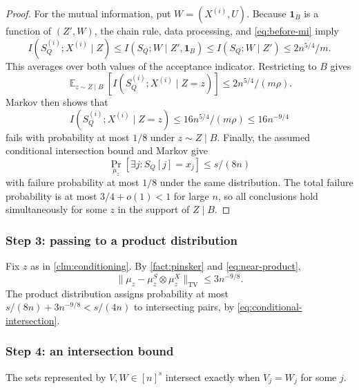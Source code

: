 \documentclass[11pt]{article}
\theoremstyle{plain}
\newcommand{\E}{\mathop{\mathbb{E}}}
\newcommand{\TV}{\mathrm{TV}}
\begin{document}
\begin{proof}
For the mutual information, put $W=(X^{(i)},U)$.
Because $\mathbf1_B$ is a function of $(Z',W)$,
the chain rule, data processing, and \eqref{eq:before-mi} imply
\[
 I(S_Q^{(i)};X^{(i)}\mid Z)
 \le I(S_Q;W\mid Z',\mathbf1_B)
 \le I(S_Q;W\mid Z')\le2n^{5/4}/m.
\]
This averages over both values of the acceptance indicator.
Restricting to $B$ gives
\[
 \E_{z\sim Z\mid B}\!\left[I(S_Q^{(i)};X^{(i)}\mid Z=z)\right]
 \le2n^{5/4}/(m\rho).
\]
Markov then shows that
\begin{equation}\label{eq:near-product}
 I(S_Q^{(i)};X^{(i)}\mid Z=z)\le16n^{5/4}/(m\rho)\le16n^{-9/4}
\end{equation}
fails with probability at most $1/8$ under $z\sim Z\mid B$.
Finally, the assumed conditional intersection bound and Markov give
\begin{equation}\label{eq:conditional-intersection}
 \Pr_{\mu_z}[\exists j:S_Q[j]=x_j]\le s/(8n)
\end{equation}
with failure probability at most $1/8$ under the same distribution.
The total failure probability is at most $3/4+o(1)<1$ for large $n$,
so all conclusions hold simultaneously for some $z$ in the support of
$Z\mid B$.
\end{proof}

\subsubsection{Step 3: passing to a product distribution}
Fix $z$ as in \cref{clm:conditioning}.
By \cref{fact:pinsker} and \eqref{eq:near-product},
\[
 \|\mu_z-\mu_z^S\otimes\mu_z^X\|_{\TV}\le3n^{-9/8}.
\]
The product distribution assigns probability at most
$s/(8n)+3n^{-9/8}<s/(4n)$ to intersecting pairs,
by \eqref{eq:conditional-intersection}.
\subsubsection{Step 4: an intersection bound}\label{sec:intersection}

The sets represented by $V,W\in[n]^s$ intersect exactly when
$V_j=W_j$ for some $j$.
\end{document}
